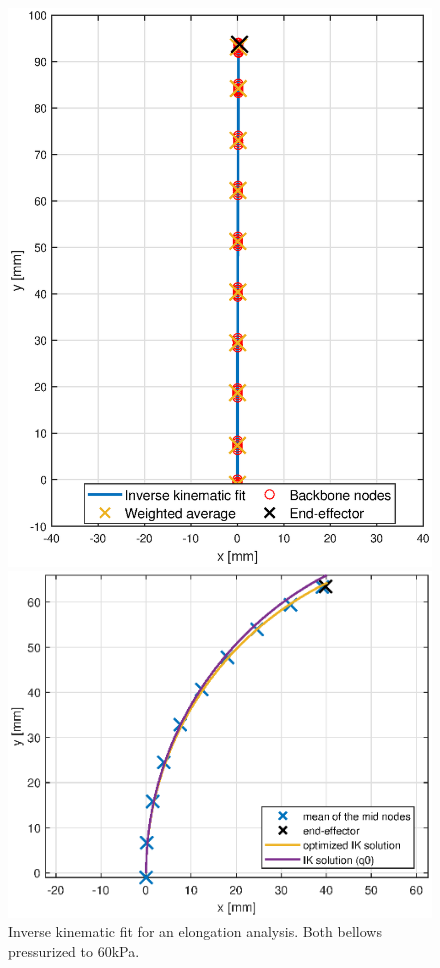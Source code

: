 \begin{figure}[H]
    \centering
\begin{minipage}{0.5\textwidth}
        \centering
        \includegraphics[width=\textwidth]{Figures/Chapter3/nodalfitelong.eps}
        \caption{Inverse kinematic fit for an elongation analysis. Both bellows pressurized to 60kPa.}
        \label{fig3:nodalfitelong}
    \end{minipage}\hfill
    \begin{minipage}{0.5\textwidth}
        \centering
        \includegraphics[width=\textwidth]{Figures/Chapter3/nodalfit.eps} 

\end{minipage}
\end{figure}
